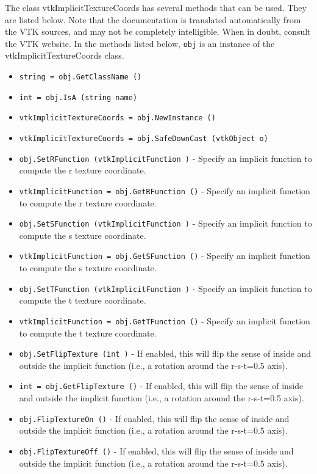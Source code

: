 The class vtkImplicitTextureCoords has several methods that can be used.
  They are listed below.
Note that the documentation is translated automatically from the VTK sources,
and may not be completely intelligible.  When in doubt, consult the VTK website.
In the methods listed below, \verb|obj| is an instance of the vtkImplicitTextureCoords class.
\begin{itemize}
\item  \verb|string = obj.GetClassName ()|

\item  \verb|int = obj.IsA (string name)|

\item  \verb|vtkImplicitTextureCoords = obj.NewInstance ()|

\item  \verb|vtkImplicitTextureCoords = obj.SafeDownCast (vtkObject o)|

\item  \verb|obj.SetRFunction (vtkImplicitFunction )| -  Specify an implicit function to compute the r texture coordinate.

\item  \verb|vtkImplicitFunction = obj.GetRFunction ()| -  Specify an implicit function to compute the r texture coordinate.

\item  \verb|obj.SetSFunction (vtkImplicitFunction )| -  Specify an implicit function to compute the s texture coordinate.

\item  \verb|vtkImplicitFunction = obj.GetSFunction ()| -  Specify an implicit function to compute the s texture coordinate.

\item  \verb|obj.SetTFunction (vtkImplicitFunction )| -  Specify an implicit function to compute the t texture coordinate.

\item  \verb|vtkImplicitFunction = obj.GetTFunction ()| -  Specify an implicit function to compute the t texture coordinate.

\item  \verb|obj.SetFlipTexture (int )| -  If enabled, this will flip the sense of inside and outside the implicit
 function (i.e., a rotation around the r-s-t=0.5 axis).

\item  \verb|int = obj.GetFlipTexture ()| -  If enabled, this will flip the sense of inside and outside the implicit
 function (i.e., a rotation around the r-s-t=0.5 axis).

\item  \verb|obj.FlipTextureOn ()| -  If enabled, this will flip the sense of inside and outside the implicit
 function (i.e., a rotation around the r-s-t=0.5 axis).

\item  \verb|obj.FlipTextureOff ()| -  If enabled, this will flip the sense of inside and outside the implicit
 function (i.e., a rotation around the r-s-t=0.5 axis).

\end{itemize}
